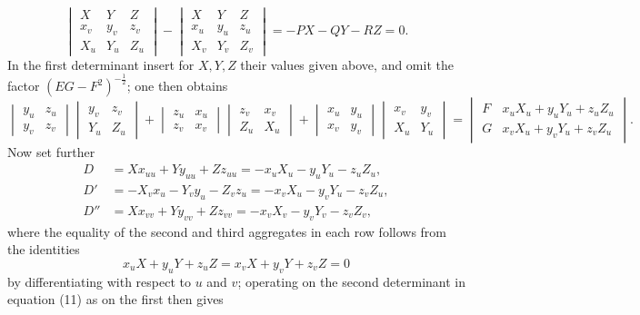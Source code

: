 \documentclass[11pt,a4paper,leqno]{article}
\begin{document}
\begin{equation}\tag{11}
\begin{vmatrix}
X&Y&Z\\
x_v&y_v&z_v\\
X_u&Y_u&Z_u
\end{vmatrix}
-
\begin{vmatrix}
X&Y&Z\\
x_u&y_u&z_u\\
X_v&Y_v&Z_v
\end{vmatrix}
=-PX-QY-RZ=0.
\end{equation}
In the first determinant insert for $X,Y,Z$ their values given above,
and omit the factor $(EG-F^2)^{-\frac12}$; one then obtains
\[
\begin{vmatrix}y_u&z_u\\y_v&z_v\end{vmatrix}
\begin{vmatrix}y_v&z_v\\Y_u&Z_u\end{vmatrix}
+
\begin{vmatrix}z_u&x_u\\z_v&x_v\end{vmatrix}
\begin{vmatrix}z_v&x_v\\Z_u&X_u\end{vmatrix}
+
\begin{vmatrix}x_u&y_u\\x_v&y_v\end{vmatrix}
\begin{vmatrix}x_v&y_v\\X_u&Y_u\end{vmatrix}
=
\begin{vmatrix}
F&x_uX_u+y_uY_u+z_uZ_u\\
G&x_vX_u+y_vY_u+z_vZ_u
\end{vmatrix}.
\]
Now set further
\[
\begin{aligned}
D&=Xx_{uu}+Yy_{uu}+Zz_{uu}
=-x_uX_u-y_uY_u-z_uZ_u,\\
D'&=-X_vx_u-Y_vy_u-Z_vz_u
=-x_vX_u-y_vY_u-z_vZ_u,\\
D''&=Xx_{vv}+Yy_{vv}+Zz_{vv}
=-x_vX_v-y_vY_v-z_vZ_v,
\end{aligned}
\]
where the equality of the second and third aggregates in each row
follows from the identities
\[
x_uX+y_uY+z_uZ=x_vX+y_vY+z_vZ=0
\]
by differentiating with respect to $u$ and $v$; operating on the second
determinant in equation (11) as on the first then gives
\end{document}
